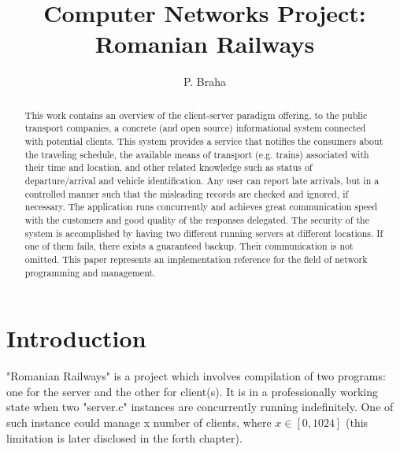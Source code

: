 \documentclass[runningheads]{llncs}
\begin{document}
\title{Computer Networks Project: \\ Romanian Railways}

\author{P. Braha}

\maketitle

\begin{abstract} This work contains an overview of the client-server paradigm offering, to the public transport companies, a concrete (and open source) informational system connected with potential clients. This system provides a service that notifies the consumers about the traveling schedule, the available means of transport (e.g. trains) associated with their time and location, and other related knowledge such as status of departure/arrival and vehicle identification. Any user can report late arrivals, but in a controlled manner such that the misleading records are checked and ignored, if necessary. The application runs concurrently and achieves great communication speed with the customers and good quality of the responses delegated. The security of the system is accomplished by having two different running servers at different locations. If one of them fails, there exists a guaranteed backup. Their communication is not omitted. This paper represents an implementation reference for the field of network programming and management.

\end{abstract}


\section{Introduction}

"Romanian Railways" is a project which involves compilation of two programs: one for the server and the other for client(s). It is in a professionally working state when two "server.c" instances are concurrently running indefinitely. One of such instance could manage x number of clients, where $x \in \left[0, 1024\right]$ (this limitation is later disclosed in the forth chapter). 
\end{document}
